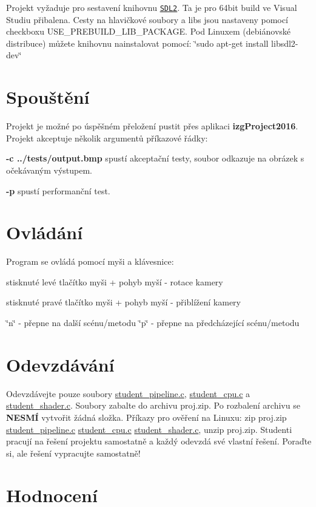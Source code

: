 Projekt vyžaduje pro sestavení knihovnu \href{https://www.libsdl.org/download-2.0.php}{\tt S\+D\+L2}. Ta je pro 64bit build ve Visual Studiu přibalena. Cesty na hlavičkové soubory a libs jsou nastaveny pomocí checkboxu U\+S\+E\+\_\+\+P\+R\+E\+B\+U\+I\+L\+D\+\_\+\+L\+I\+B\+\_\+\+P\+A\+C\+K\+A\+GE. Pod Linuxem (debiánovské distribuce) můžete knihovnu nainstalovat pomocí\+: \char`\"{}sudo apt-\/get install libsdl2-\/dev\char`\"{}\hypertarget{index_spousteni}{}\section{Spouštění}\label{index_spousteni}
Projekt je možné po úspěšném přeložení pustit přes aplikaci {\bfseries izg\+Project2016}. Projekt akceptuje několik argumentů příkazové řádky\+:
\begin{DoxyItemize}
\item {\bfseries -\/c ../tests/output.bmp} spustí akceptační testy, soubor odkazuje na obrázek s očekávaným výstupem.
\item {\bfseries -\/p} spustí performanční test.
\end{DoxyItemize}\hypertarget{index_ovladani}{}\section{Ovládání}\label{index_ovladani}
Program se ovládá pomocí myši a klávesnice\+:
\begin{DoxyItemize}
\item stisknuté levé tlačítko myši + pohyb myší -\/ rotace kamery
\item stisknuté pravé tlačítko myši + pohyb myší -\/ přiblížení kamery
\item \char`\"{}n\char`\"{} -\/ přepne na další scénu/metodu \char`\"{}p\char`\"{} -\/ přepne na předcházející scénu/metodu
\end{DoxyItemize}\hypertarget{index_odevzdavani}{}\section{Odevzdávání}\label{index_odevzdavani}
Odevzdávejte pouze soubory \hyperlink{student__pipeline_8c}{student\+\_\+pipeline.\+c}, \hyperlink{student__cpu_8c}{student\+\_\+cpu.\+c} a \hyperlink{student__shader_8c}{student\+\_\+shader.\+c}. Soubory zabalte do archivu proj.\+zip. Po rozbalení archivu se {\bfseries N\+E\+S\+MÍ} vytvořit žádná složka. Příkazy pro ověření na Linuxu\+: zip proj.\+zip \hyperlink{student__pipeline_8c}{student\+\_\+pipeline.\+c} \hyperlink{student__cpu_8c}{student\+\_\+cpu.\+c} \hyperlink{student__shader_8c}{student\+\_\+shader.\+c}, unzip proj.\+zip. Studenti pracují na řešení projektu samostatně a každý odevzdá své vlastní řešení. Poraďte si, ale řešení vypracujte samostatně!\hypertarget{index_hodnoceni}{}\section{Hodnocení}\label{index_hodnoceni}
